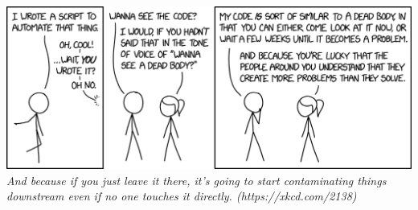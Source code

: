 \renewcommand{\cftchapleader}{\cftdotfill{\cftdotsep}}

\tableofcontents

\vfill

\begin{center}
\includegraphics[width=\textwidth,keepaspectratio]{img/xkcd/wanna_see_the_code.png}
{\footnotesize \textit{And because if you just leave it there, it's going to start contaminating things downstream even if no one touches it directly.  (https://xkcd.com/2138)}}
\end{center}

